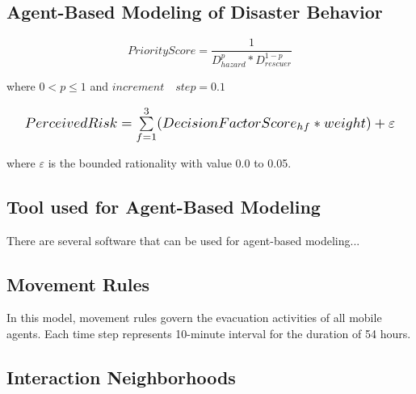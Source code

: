 \documentclass[runningheads]{llncs}
\begin{document}
\subsection{Agent-Based Modeling of Disaster Behavior}

\begin{equation} \label{eq:priorityHousehold}
	PriorityScore = \frac{1}{D_{hazard}^{p} * D_{rescuer}^{1-p}} 
\end{equation}

where $0 < p \leq 1$ and $increment \quad step = 0.1$

\begin{equation}\label{eq:perceivedRisk}
    \resizebox{0.95\hsize}{!}{%
	$PerceivedRisk = \sum\limits_{f=1}^{3}(DecisionFactorScore_{hf} * weight) + \varepsilon$%
	}
\end{equation}

where $\varepsilon$ is the bounded rationality with value 0.0 to 0.05.

\subsection{Tool used for Agent-Based Modeling}
There are several software that can be used for agent-based modeling... 

\subsection{Movement Rules}
In this model, movement rules govern the evacuation activities of all mobile agents. Each time step represents 10-minute interval for the duration of 54 hours. 


\subsection{Interaction Neighborhoods}
\end{document}
